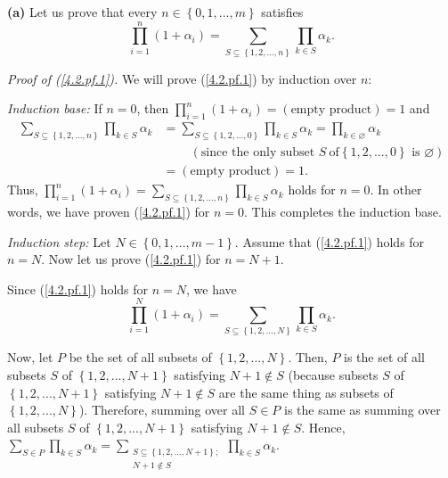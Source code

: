 \documentclass[numbers=enddot,12pt,final,onecolumn,notitlepage]{scrartcl}%
\begin{document}
\textbf{(a)} Let us prove that every $n\in\left\{  0,1,...,m\right\}  $
satisfies%
\begin{equation}
\prod\limits_{i=1}^{n}\left(  1+\alpha_{i}\right)  =\sum\limits_{S\subseteq
\left\{  1,2,...,n\right\}  }\prod\limits_{k\in S}\alpha_{k}. \label{4.2.pf.1}%
\end{equation}


\textit{Proof of (\ref{4.2.pf.1}).} We will prove (\ref{4.2.pf.1}) by
induction over $n$:

\textit{Induction base:} If $n=0$, then $\prod\limits_{i=1}^{n}\left(
1+\alpha_{i}\right)  =\left(  \text{empty product}\right)  =1$ and
\begin{align*}
\sum\limits_{S\subseteq\left\{  1,2,...,n\right\}  }\prod\limits_{k\in
S}\alpha_{k}  &  =\sum\limits_{S\subseteq\left\{  1,2,...,0\right\}  }%
\prod\limits_{k\in S}\alpha_{k}=\prod\limits_{k\in\varnothing}\alpha_{k}\\
&  \ \ \ \ \ \ \ \ \ \ \left(  \text{since the only subset }S\ \text{of
}\left\{  1,2,...,0\right\}  \text{ is }\varnothing\right) \\
&  =\left(  \text{empty product}\right)  =1.
\end{align*}
Thus, $\prod\limits_{i=1}^{n}\left(  1+\alpha_{i}\right)  =\sum
\limits_{S\subseteq\left\{  1,2,...,n\right\}  }\prod\limits_{k\in S}%
\alpha_{k}$ holds for $n=0$. In other words, we have proven (\ref{4.2.pf.1})
for $n=0$. This completes the induction base.

\textit{Induction step:} Let $N\in\left\{  0,1,...,m-1\right\}  $. Assume that
(\ref{4.2.pf.1}) holds for $n=N$. Now let us prove (\ref{4.2.pf.1}) for
$n=N+1$.

Since (\ref{4.2.pf.1}) holds for $n=N$, we have%
\[
\prod\limits_{i=1}^{N}\left(  1+\alpha_{i}\right)  =\sum\limits_{S\subseteq
\left\{  1,2,...,N\right\}  }\prod\limits_{k\in S}\alpha_{k}.
\]


Now, let $P$ be the set of all subsets of $\left\{  1,2,...,N\right\}  $.
Then, $P$ is the set of all subsets $S$ of $\left\{  1,2,...,N+1\right\}  $
satisfying $N+1\notin S$ (because subsets $S$ of $\left\{
1,2,...,N+1\right\}  $ satisfying $N+1\notin S$ are the same thing as subsets
of $\left\{  1,2,...,N\right\}  $). Therefore, summing over all $S\in P$ is
the same as summing over all subsets $S$ of $\left\{  1,2,...,N+1\right\}  $
satisfying $N+1\notin S$. Hence, $\sum\limits_{S\in P}\prod\limits_{k\in
S}\alpha_{k}=\sum\limits_{\substack{S\subseteq\left\{  1,2,...,N+1\right\}
;\\N+1\notin S}}\prod\limits_{k\in S}\alpha_{k}$.
\end{document}
